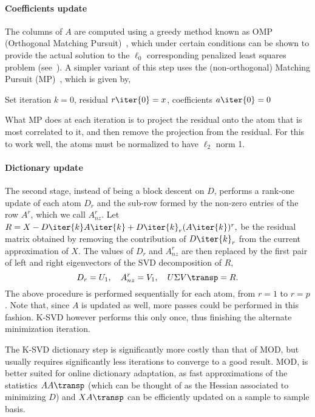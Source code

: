 \documentclass[a4paper]{IEEEtran}
\begin{document}
\paragraph{Coefficients update} The columns of $A$ are computed using a greedy method known as OMP (Orthogonal Matching Pursuit)~\cite{omp}, which   under certain conditions can be shown to provide the actual solution to the $\ell_0$ corresponding penalized least squares problem (see~\cite{tropp04?}). A simpler variant of this step uses the (non-orthogonal) Matching Pursuit (MP)~\cite{mp}, which is given by, 
\begin{algorithm}[ht]
Set iteration $k=0$, residual $r\iter{0}=x$, coefficients $a\iter{0}=0$\;
\label{alg:omp}
\end{algorithm}
What MP does at each iteration is to project the residual onto the atom that is most correlated to it, and then remove the projection from the residual. For this to work well, the atoms must be normalized to have $\ell_2$ norm 1.

\paragraph{Dictionary update} The second stage, instead of being a block descent on $D$, performs a rank-one update of each atom $D_r$ and the sub-row formed by the non-zero entries of the row $A^r$, which we call $A^r_{nz}$. Let $R = X - D\iter{k}A\iter{k} + D\iter{k}_r(A\iter{k})^r,$ be the residual matrix obtained by removing the contribution of $D\iter{k}_r$ from the current approximation of $X$. The values of $D_r$ and $A_{nz}^r$ are then replaced by the first pair of left and right eigenvectors of the SVD decomposition of $R$, 
\begin{equation}
D_r = U_1,\quad A_{nz}^r=V_1,\quad U\Sigma V\transp=R.
\label{eq:ksvd3}
\end{equation}
The above procedure is performed sequentially for each atom, from $r=1$ to $r=p$. Note that, since $A$ is updated as well, more passes could be performed in this fashion. K-SVD however performs this only once, thus finishing the alternate minimization iteration.

The K-SVD dictionary step is significantly more costly than that of MOD, but usually requires significantly less iterations to converge to a good result. MOD, is better suited for online dictionary adaptation, as fast approximations of the statistics $AA\transp$ (which can be thought of as the Hessian associated to minimizing $D$)  and $XA\transp$ can be efficiently updated on a sample to sample basis.
\end{document}
